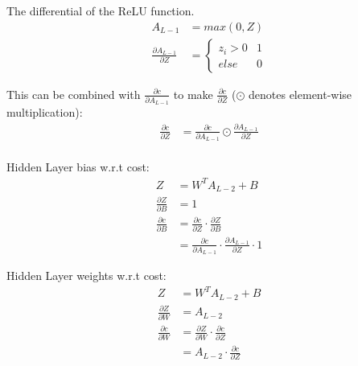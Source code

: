 The differential of the ReLU function.
\begin{equation}
    \begin{aligned}
        A_{L-1} &= max(0,Z)\\[2em]
        \frac{\partial A_{L-1}}{\partial Z} &= 
        \begin{cases}
            z_{i} > 0 & 1 \\
            else & 0
        \end{cases}
    \end{aligned}
\end{equation}

This can be combined with \( \frac{\partial c}{\partial A_{L-1}} \) to make \(
\frac{\partial c}{\partial Z} \) (\( \odot \) denotes element-wise
multiplication):
\begin{equation}
    \begin{aligned}
        \frac{\partial c}{\partial Z} &= \frac{\partial c}{\partial A_{L-1}} \odot \frac{\partial A_{L-1}}{\partial Z}\\
    \end{aligned}
\end{equation}

Hidden Layer bias w.r.t cost:
\begin{equation}
    \begin{aligned}
        Z &= W^{T}A_{L-2} + B\\
        \frac{\partial Z}{\partial B} &= 1\\[2em]
        \frac{\partial c}{\partial B} &= \frac{\partial c}{\partial Z} \cdot \frac{\partial Z}{\partial B}\\
                                      &= \frac{\partial c}{\partial A_{L-1}} \cdot \frac{\partial A_{L-1}}{\partial Z} \cdot 1
    \end{aligned}
\end{equation}

Hidden Layer weights w.r.t cost:
\begin{equation}
    \begin{aligned}
        Z &= W^{T}A_{L-2} + B\\
        \frac{\partial Z}{\partial W} &= A_{L-2}\\[2em]
        \frac{\partial c}{\partial W} &= \frac{\partial Z}{\partial W} \cdot \frac{\partial c}{\partial Z}\\
                                      &= A_{L-2} \cdot \frac{\partial c}{\partial Z}
    \end{aligned}
\end{equation}

